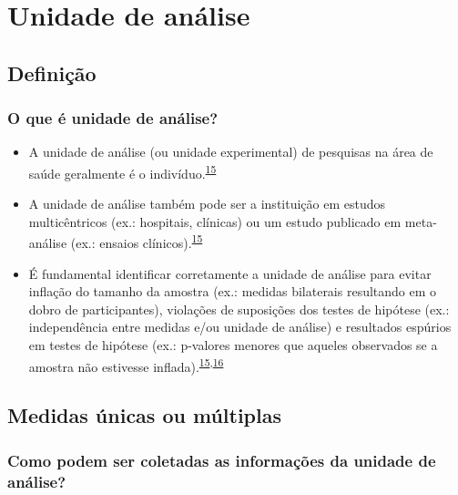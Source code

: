 \documentclass[
]{book}
\begin{document}
\hypertarget{unidade-analise}{%
\chapter{\texorpdfstring{\textbf{Unidade de análise}}{Unidade de análise}}\label{unidade-analise}}

\hypertarget{definicao}{%
\section{Definição}\label{definicao}}

\hypertarget{o-que-uxe9-unidade-de-anuxe1lise}{%
\subsection{O que é unidade de análise?}\label{o-que-uxe9-unidade-de-anuxe1lise}}

\begin{itemize}
\item
  A unidade de análise (ou unidade experimental) de pesquisas na área de saúde geralmente é o indivíduo.\textsuperscript{\protect\hyperlink{ref-Altman1997}{15}}
\item
  A unidade de análise também pode ser a instituição em estudos multicêntricos (ex.: hospitais, clínicas) ou um estudo publicado em meta-análise (ex.: ensaios clínicos).\textsuperscript{\protect\hyperlink{ref-Altman1997}{15}}
\item
  É fundamental identificar corretamente a unidade de análise para evitar inflação do tamanho da amostra (ex.: medidas bilaterais resultando em o dobro de participantes), violações de suposições dos testes de hipótese (ex.: independência entre medidas e/ou unidade de análise) e resultados espúrios em testes de hipótese (ex.: p-valores menores que aqueles observados se a amostra não estivesse inflada).\textsuperscript{\protect\hyperlink{ref-Altman1997}{15},\protect\hyperlink{ref-Matthews1990}{16}}
\end{itemize}

\hypertarget{medidas}{%
\section{Medidas únicas ou múltiplas}\label{medidas}}

\hypertarget{como-podem-ser-coletadas-as-informauxe7uxf5es-da-unidade-de-anuxe1lise}{%
\subsection{Como podem ser coletadas as informações da unidade de análise?}\label{como-podem-ser-coletadas-as-informauxe7uxf5es-da-unidade-de-anuxe1lise}}
\end{document}
